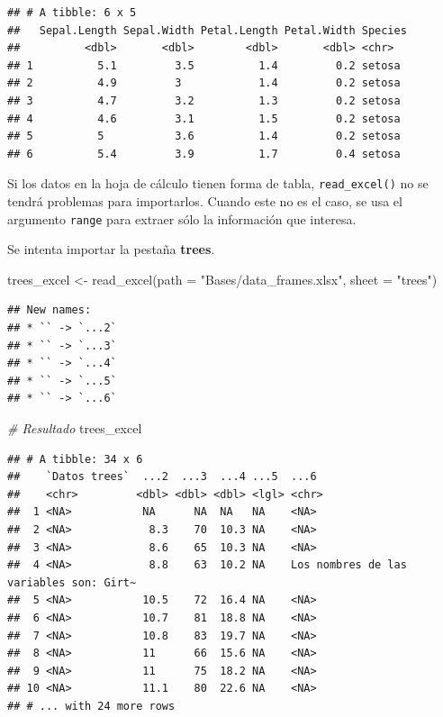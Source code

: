 \documentclass[
]{book}
\newenvironment{Shaded}{\begin{snugshade}}{\end{snugshade}}
\newcommand{\AttributeTok}[1]{\textcolor[rgb]{0.77,0.63,0.00}{#1}}
\newcommand{\CommentTok}[1]{\textcolor[rgb]{0.56,0.35,0.01}{\textit{#1}}}
\newcommand{\FunctionTok}[1]{\textcolor[rgb]{0.00,0.00,0.00}{#1}}
\newcommand{\NormalTok}[1]{#1}
\newcommand{\OtherTok}[1]{\textcolor[rgb]{0.56,0.35,0.01}{#1}}
\newcommand{\StringTok}[1]{\textcolor[rgb]{0.31,0.60,0.02}{#1}}
\begin{document}
\begin{verbatim}
## # A tibble: 6 x 5
##   Sepal.Length Sepal.Width Petal.Length Petal.Width Species
##          <dbl>       <dbl>        <dbl>       <dbl> <chr>  
## 1          5.1         3.5          1.4         0.2 setosa 
## 2          4.9         3            1.4         0.2 setosa 
## 3          4.7         3.2          1.3         0.2 setosa 
## 4          4.6         3.1          1.5         0.2 setosa 
## 5          5           3.6          1.4         0.2 setosa 
## 6          5.4         3.9          1.7         0.4 setosa
\end{verbatim}

Si los datos en la hoja de cálculo tienen forma de tabla, \texttt{read\_excel()} no se tendrá problemas para importarlos. Cuando este no es el caso, se usa el argumento \texttt{range} para extraer sólo la información que interesa.

Se intenta importar la pestaña \textbf{trees}.

\begin{Shaded}
\begin{Highlighting}[]
\NormalTok{trees\_excel }\OtherTok{\textless{}{-}} \FunctionTok{read\_excel}\NormalTok{(}\AttributeTok{path =} \StringTok{"Bases/data\_frames.xlsx"}\NormalTok{, }\AttributeTok{sheet =} \StringTok{"trees"}\NormalTok{)}
\end{Highlighting}
\end{Shaded}

\begin{verbatim}
## New names:
## * `` -> `...2`
## * `` -> `...3`
## * `` -> `...4`
## * `` -> `...5`
## * `` -> `...6`
\end{verbatim}

\begin{Shaded}
\begin{Highlighting}[]
\CommentTok{\# Resultado}
\NormalTok{trees\_excel}
\end{Highlighting}
\end{Shaded}

\begin{verbatim}
## # A tibble: 34 x 6
##    `Datos trees`  ...2  ...3  ...4 ...5  ...6                                   
##    <chr>         <dbl> <dbl> <dbl> <lgl> <chr>                                  
##  1 <NA>           NA      NA  NA   NA    <NA>                                   
##  2 <NA>            8.3    70  10.3 NA    <NA>                                   
##  3 <NA>            8.6    65  10.3 NA    <NA>                                   
##  4 <NA>            8.8    63  10.2 NA    Los nombres de las variables son: Girt~
##  5 <NA>           10.5    72  16.4 NA    <NA>                                   
##  6 <NA>           10.7    81  18.8 NA    <NA>                                   
##  7 <NA>           10.8    83  19.7 NA    <NA>                                   
##  8 <NA>           11      66  15.6 NA    <NA>                                   
##  9 <NA>           11      75  18.2 NA    <NA>                                   
## 10 <NA>           11.1    80  22.6 NA    <NA>                                   
## # ... with 24 more rows
\end{verbatim}
\end{document}
